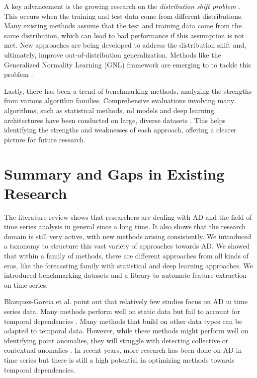 A key advancement is the growing research on the \textit{distribution shift problem} \cite{distshift1,distshift2,distshift3,distshift4,distshift5}. This occurs when the training and test data come from different distributions. Many existing methods assume that the test and training data come from the same distribution, which can lead to bad performance if this assumption is not met. New approaches are being developed to address the distribution shift and, ultimately, improve out-of-distribution generalization. Methods like the Generalized Normality Learning (GNL) framework are emerging to to tackle this problem \cite{Cao2023}.

Lastly, there has been a trend of benchmarking methods, analyzing the strengths from various algorithm families. Comprehensive evaluations involving many algorithms, such as statistical methods, ml models and deep learning architectures have been conducted on large, diverse datasets \cite{Schmidl2022}. This helps identifying the strengths and weaknesses of each approach, offering a clearer picture for future research.


\section{Summary and Gaps in Existing Research}
The literature review shows that researchers are dealing with AD and the field of time series analysis in general since a long time. It also shows that the research domain is still very active, with new methods arising consistently. We introduced a taxonomy to structure this vast variety of approaches towards AD. We showed that within a family of methods, there are different approaches from all kinds of eras, like the forecasting family with statistical and deep learning approaches. We introduced benchmarking datasets and a library to automate feature extraction on time series.

Blazquez-Garcia et al. point out that relatively few studies focus on AD in time series data. Many methods perform well on static data but fail to account for temporal dependencies \cite{BlazquezGarcia2021}. Many methods that build on other data types can be adapted to temporal data. However, while these methods might perform well on identifying point anomalies, they will struggle with detecting collective or contextual anomalies \cite{Braei2020}. In recent years, more research has been done on AD in time series but there is still a high potential in optimizing methods towards temporal dependencies.

